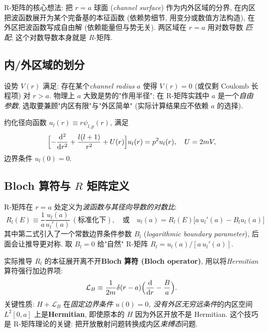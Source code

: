 R-矩阵的核心想法: 把 $r=a$ 球面 (\emph{channel surface}) 作为内外区域的分界, 在内区把波函数展开为某个完备基的本征函数 (依赖势细节, 用变分或数值方法构造), 在外区把波函数写成自由解 (依赖能量但与势无关). 两区域在 $r=a$ 用对数导数 \emph{匹配}; 这个对数导数本身就是 $R$-矩阵.

\subsection{内/外区域的划分}\label{sec:Rmatrix-split}

设势 $V(r)$ 满足: 存在某个\emph{channel radius} $a$ 使得 $V(r)=0$ (或仅剩 Coulomb 长程项) 对 $r>a$. 物理上 $a$ 大致是势的"作用半径"; 在 R-矩阵实践中 $a$ 是一个\emph{自由参数}, 选取要兼顾"内区有限"与"外区简单" (实际计算结果应不依赖 $a$ 的选择).

约化径向函数 $u_l(r)\equiv r\psi_{l,p}(r)$, 满足
\begin{equation}
  \Bigl[-\frac{\mathrm{d}^2}{\mathrm{d} r^2}+\frac{l(l+1)}{r^2}+U(r)\Bigr]u_l(r)=p^2 u_l(r),\quad U=2mV,
  \label{eq:R-radial}
\end{equation}
边界条件 $u_l(0)=0$.

\subsection{Bloch 算符与 $R$ 矩阵定义}\label{sec:Rmatrix-Bloch}

R-矩阵在 $r=a$ 处定义为\emph{波函数与其径向导数的对数比}:
\begin{equation}
  \boxed{\;R_l(E)\equiv\frac{1}{a}\frac{u_l(a)}{u_l'(a)}\,(\text{标准化下}),\quad\text{或}\quad u_l(a)=R_l(E)\bigl[a\,u_l'(a)-B_l u_l(a)\bigr]\;}
  \label{eq:R-def-clean}
\end{equation}
其中第二式引入了一个常数边界条件参数 $B_l$ (\emph{logarithmic boundary parameter}), 后面会让推导更对称. 取 $B_l=0$ 给"自然" R-矩阵 $R_l=u_l(a)/[a\,u_l'(a)]$.

实际推导 $R_l$ 的本征展开离不开\textbf{Bloch 算符 (Bloch operator)}, 用以将\emph{Hermitian} 算符强行加边界项:
\begin{equation}
  \mathcal L_B\equiv\frac{1}{2m}\delta(r-a)\Bigl(\frac{\mathrm{d}}{\mathrm{d} r}-\frac{B}{a}\Bigr).
  \label{eq:R-Bloch}
\end{equation}
关键性质: $H+\mathcal L_B$ 在\emph{固定边界条件 $u(0)=0$, 没有外区无穷远条件}的内区空间 $L^2[0,a]$ 上是\textbf{Hermitian}, 即使原本的 $H$ 因为外区开放不是 Hermitian. 这个技巧是 R-矩阵理论的关键: 把开放散射问题转换成内区\emph{束缚态}问题.

